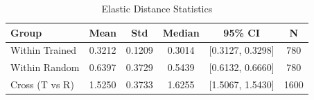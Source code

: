 \begin{table}[h!]
\centering
\caption{Elastic Distance Statistics}
\begin{tabular}{lccccc}
\toprule
Group & Mean & Std & Median & 95\% CI & N \\
\midrule
Within Trained & 0.3212 & 0.1209 & 0.3014 & [0.3127, 0.3298] & 780 \\
Within Random & 0.6397 & 0.3729 & 0.5439 & [0.6132, 0.6660] & 780 \\
Cross (T vs R) & 1.5250 & 0.3733 & 1.6255 & [1.5067, 1.5430] & 1600 \\
\bottomrule
\end{tabular}
\end{table}
